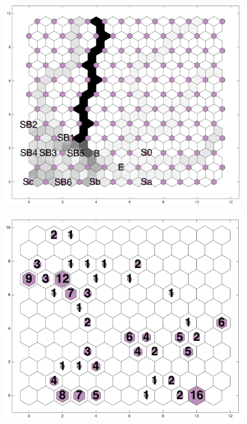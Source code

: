 \begin{figure}
\begin{subfigure}[b]{0.45\textwidth}
                \includegraphics[width=\textwidth]{images0.01/2d/dist_12_by_self_org_res12.png}
            \end{subfigure}
            \hfill
            \begin{subfigure}[b]{0.45\textwidth}
                \includegraphics[width=\textwidth]{images0.01/2d/hit_v_12_by_12.png}
            \end{subfigure}
            \hfill
            \begin{subfigure}[b]{0.45\textwidth}

\end{subfigure}
\end{figure}
